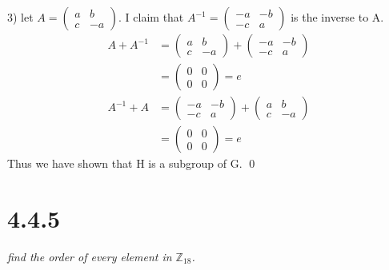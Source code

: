 \documentclass[a4paper, 11pt]{article}
\begin{document}
3) let $A = 
	\begin{pmatrix}
		a & b \\
		c & -a
	\end{pmatrix}$. I claim that $A^{-1} = 
	\begin{pmatrix}
		-a & -b \\ 
		-c & a
	\end{pmatrix}$ is the inverse to A.
\begin{align*}
	A+A^{-1} &= 
	\begin{pmatrix}
		a & b \\ 
		c & -a 
	\end{pmatrix} + 
	\begin{pmatrix}
		-a & -b \\ 
		-c & a 
	\end{pmatrix} \\ 
	&= 
	\begin{pmatrix}
		0 & 0 \\ 
		0 & 0
	\end{pmatrix} = e \\
	A^{-1}+A &=
	\begin{pmatrix}
		-a & -b \\ 
		-c & a 
	\end{pmatrix} + 
	\begin{pmatrix}
		a & b \\ 
		c & -a 
	\end{pmatrix} \\ 
	&= 
	\begin{pmatrix}
		0 & 0 \\ 
		0 & 0
	\end{pmatrix} = e 
\end{align*}
Thus we have shown that H is a subgroup of G. \qed

\section*{4.4.5}
\textit{find the order of every element in $\mathbb{Z}_{18}$.}\\ 
\end{document}
